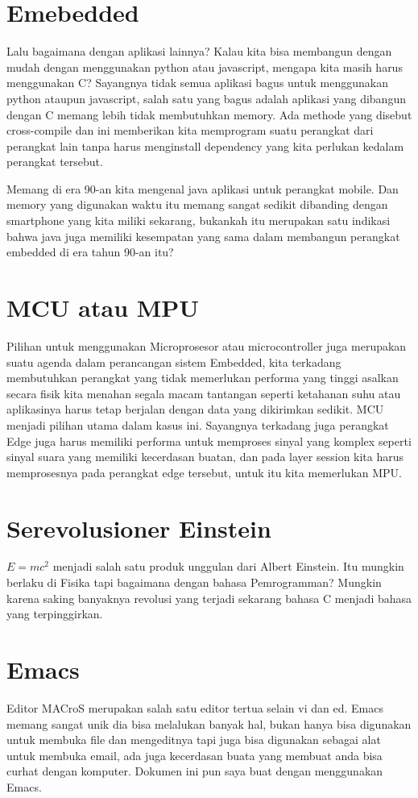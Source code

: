 \documentclass[11pt]{article}
\begin{document}
\section{Emebedded}
\label{sec:orgd81b1f7}
Lalu bagaimana dengan aplikasi lainnya? Kalau kita bisa membangun dengan mudah 
dengan menggunakan python atau javascript, mengapa kita masih harus menggunakan 
C? Sayangnya tidak semua aplikasi bagus untuk menggunakan python ataupun javascript,
salah satu yang bagus adalah aplikasi yang dibangun dengan C memang lebih 
tidak membutuhkan memory. Ada methode yang disebut cross-compile dan ini 
memberikan kita memprogram suatu perangkat dari perangkat lain tanpa harus 
menginstall dependency yang kita perlukan kedalam perangkat tersebut. 

Memang di era 90-an kita mengenal java aplikasi untuk perangkat mobile. Dan 
memory yang digunakan waktu itu memang sangat sedikit dibanding dengan smartphone
yang kita miliki sekarang, bukankah itu merupakan satu indikasi bahwa java
juga memiliki kesempatan yang sama dalam membangun perangkat embedded di 
era tahun 90-an itu?

\section{MCU atau MPU}
\label{sec:org2d62ebf}
Pilihan untuk menggunakan Microprosesor atau microcontroller juga merupakan 
suatu agenda dalam perancangan sistem Embedded, kita terkadang membutuhkan 
perangkat yang tidak memerlukan performa yang tinggi asalkan secara fisik 
kita menahan segala macam tantangan seperti ketahanan suhu atau aplikasinya harus
tetap berjalan dengan data yang dikirimkan sedikit. MCU menjadi pilihan utama
dalam kasus ini. Sayangnya terkadang juga perangkat Edge juga harus memiliki 
performa untuk memproses sinyal yang komplex seperti sinyal suara yang memiliki
kecerdasan buatan, dan pada layer session kita harus memprosesnya pada perangkat
edge tersebut, untuk itu kita memerlukan MPU. 

\section{Serevolusioner Einstein}
\label{sec:orgb978137}
\(E=mc^2\) menjadi salah satu produk unggulan dari Albert Einstein. Itu mungkin
berlaku di Fisika tapi bagaimana dengan bahasa Pemrogramman? Mungkin karena 
saking banyaknya revolusi yang terjadi sekarang bahasa C menjadi bahasa yang 
terpinggirkan.

\section{Emacs}
\label{sec:orge17e789}
Editor MACroS merupakan salah satu editor tertua selain vi dan ed. Emacs 
memang sangat unik dia bisa melalukan banyak hal, bukan hanya bisa digunakan
untuk membuka file dan mengeditnya tapi juga bisa digunakan sebagai alat untuk
membuka email, ada juga kecerdasan buata yang membuat anda bisa curhat dengan 
komputer. Dokumen ini pun saya buat dengan menggunakan Emacs.
\end{document}
